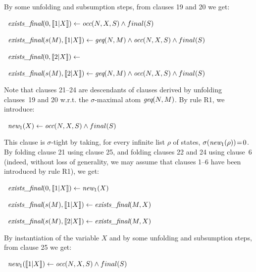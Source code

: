 \documentclass[english]{tlp}
\newcommand{\Mathit}[1]{\mbox{\it #1}}
\begin{document}
\begin{example}
\smallskip

\noindent By some unfolding and subsumption steps, from clauses 19 and 20 we
get:

\smallskip

~$\Mathit{exists\_final}(0,\llbracket
1|X\rrbracket) \leftarrow {\Mathit{occ}}(N,X,S)\wedge final(S)$

~$\Mathit{exists\_final}(s(M),\llbracket
1|X\rrbracket) \leftarrow \Mathit{geq}(N,M)\wedge
{\Mathit{occ}}(N,X,S)\wedge final(S)$

~$\Mathit{exists\_final}(0,\llbracket
2|X\rrbracket)\leftarrow$

~$\Mathit{exists\_final}(s(M),\llbracket
2|X\rrbracket) \leftarrow \Mathit{geq}(N,M)\wedge
{\Mathit{occ}}(N,X,S)\wedge final(S)$

\smallskip

\noindent Note that clauses 21--24 are descendants of clauses derived by
unfolding clauses~19 and 20 w.r.t. the $\sigma$-maximal atom
$\Mathit{geq}(N,M)$. By rule R1, we introduce:

\smallskip

~$\Mathit{new}_1(X) \leftarrow
{\Mathit{occ}}(N,X,S)\wedge final(S)$

\smallskip

\noindent This clause is $\sigma$-tight by taking, for
every infinite list $\rho$ of states, $\sigma(\Mathit{new}_1(\rho))\!=\!0$. By
folding clause 21 using clause 25, and folding clauses 22 and 24 using clause~6
(indeed, without loss of generality, we may assume that clauses 1--6 have been
introduced by rule R1), we get:

\smallskip

~$\Mathit{exists\_final}(0,\llbracket
1|X\rrbracket) \leftarrow \Mathit{new}_1(X)$

~$\Mathit{exists\_final}(s(M),\llbracket
1|X\rrbracket) \leftarrow \Mathit{exists\_final}(M,X)$

~$\Mathit{exists\_final}(s(M),\llbracket
2|X\rrbracket) \leftarrow \Mathit{exists\_final}(M,X)$

\smallskip

\noindent By instantiation of the variable $X$ and by some unfolding and
subsumption steps, from clause 25 we get:

\smallskip

~$\Mathit{new}_1(\llbracket 1|X\rrbracket)
\leftarrow {\Mathit{occ}}(N,X,S)\wedge final(S)$\hspace{2cm}


\end{example}
\end{document}
